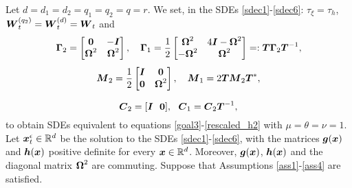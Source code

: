 \begin{corollary} \label{model4}
Let $d=d_1=d_2=q_1=q_2=q=r$.  We set, in the SDEs \eqref{sdec1}-\eqref{sdec6}:   $\tau_{\xi} = \tau_{h}$, $\boldsymbol{W}_t^{(q_2)} = \boldsymbol{W}^{(d)}_t = \boldsymbol{W}_t$ and
\begin{equation}
\vecc{\Gamma}_2 =  
\begin{bmatrix} 
\vecc{0} & -\vecc{I} \\
\vecc{\Omega}^2 & \vecc{\Omega}^2 
\end{bmatrix}, \ \ \ 
\vecc{\Gamma}_1 = \frac{1}{2}
\begin{bmatrix} 
\vecc{\Omega}^2 & 4\vecc{I}-\vecc{\Omega}^2 \\
-\vecc{\Omega}^2 & \vecc{\Omega}^2 
\end{bmatrix} =: \vecc{T} \vecc{\Gamma}_2 \vecc{T}^{-1}, \end{equation}
\begin{equation}
\boldsymbol{M}_2  =  
\frac{1}{2} \begin{bmatrix} 
\boldsymbol{I} & \boldsymbol{0} \\
\boldsymbol{0} & \boldsymbol{\Omega}^2 
\end{bmatrix}, \ \ \ \boldsymbol{M}_1 = 2\boldsymbol{T} \boldsymbol{M}_2 \boldsymbol{T}^*, \end{equation}

\begin{equation} \vecc{C}_2 = [\vecc{I} \ \  \vecc{0}], \ \ \vecc{C}_1 = \vecc{C}_2 \vecc{T}^{-1},  \end{equation}
to obtain SDEs equivalent to equations \eqref{goal3}-\eqref{rescaled_h2} with $\mu = \theta = \nu = 1$.  Let $\boldsymbol{x}^\epsilon_{t} \in \mathbb{R}^{d}$ be the solution to the SDEs \eqref{sdec1}-\eqref{sdec6}, with the matrices $\boldsymbol{g}(\boldsymbol{x})$ and $\boldsymbol{h}(\boldsymbol{x})$ positive definite for every $\boldsymbol{x} \in \mathbb{R}^d$. Moreover, $\boldsymbol{g}(\boldsymbol{x})$, $\boldsymbol{h}(\boldsymbol{x})$ and the diagonal matrix $\boldsymbol{\Omega}^2$ are commuting. Suppose that Assumptions \ref{ass1}-\ref{ass4} are satisfied. 



\end{corollary}

